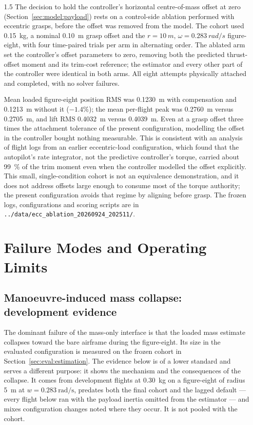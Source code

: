 \begin{spacing}{1.5}
The decision to hold the controller's horizontal centre-of-mass offset at zero
(Section~\ref{sec:model:payload}) rests on a control-side ablation performed
with eccentric grasps, before the offset was removed from the model. The cohort
used \SI{0.15}{\kg}, a nominal \SI{0.10}{\meter} grasp offset and the
$r=\SI{10}{m}$, $\omega=\SI{0.283}{rad/s}$ figure-eight, with four time-paired
trials per arm in alternating order. The ablated arm set the controller's offset
parameters to zero, removing both the predicted thrust-offset moment and its
trim-cost reference; the estimator and every other part of the controller were
identical in both arms. All eight attempts physically attached and completed,
with no solver failures.

Mean loaded figure-eight position RMS was \SI{0.1230}{m} with compensation and
\SI{0.1213}{m} without it ($-1.4\%$); the mean per-flight peak was
\SI{0.2760}{m} versus \SI{0.2705}{m}, and lift RMS \SI{0.4032}{m} versus
\SI{0.4039}{m}. Even at a grasp offset three times the attachment tolerance of
the present configuration, modelling the offset in the controller bought nothing
measurable. This is consistent with an analysis of flight logs from an earlier
eccentric-load configuration, which found that the autopilot's rate integrator,
not the predictive controller's torque, carried about \SI{99}{\percent} of the
trim moment even when the controller modelled the offset explicitly. This small,
single-condition cohort is not an equivalence demonstration, and it does not
address offsets large enough to consume most of the torque authority; the
present configuration avoids that regime by aligning before grasp. The frozen
logs, configurations and scoring scripts are in
\texttt{../data/ecc\_ablation\_20260924\_202511/}.

\section{Failure Modes and Operating Limits}\label{sec:eval:limits}

\subsection{Manoeuvre-induced mass collapse: development evidence}\label{sec:eval:collapse}

The dominant failure of the mass-only interface is that the loaded mass estimate
collapses toward the bare airframe during the figure-eight. Its size in the
evaluated configuration is measured on the frozen cohort in
Section~\ref{sec:eval:estimation}. The evidence below is of a lower standard and
serves a different purpose: it shows the mechanism and the consequences of the
collapse. It comes from development flights at \SI{0.30}{\kg} on a figure-eight
of radius \SI{5}{\meter} at $w=\SI{0.283}{\radian\per\second}$, predates both
the final cohort and the lagged default --- every flight below ran with the
payload inertia omitted from the estimator --- and mixes configuration changes
noted where they occur. It is not pooled with the cohort.


\end{spacing}
